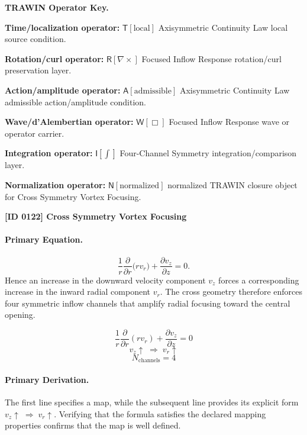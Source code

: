 \par\vspace{0.45\baselineskip}
\noindent\begin{minipage}[t]{\linewidth}
\begingroup
\small
\raggedright
\textbf{TRAWIN Operator Key.}\par
\noindent\textbf{Time/localization operator:} $\mathsf{T}\!\left[\mathrm{local}\right]$ Axisymmetric Continuity Law local source condition.\par
\noindent\textbf{Rotation/curl operator:} $\mathsf{R}\!\left[\nabla\times\right]$ Focused Inflow Response rotation/curl preservation layer.\par
\noindent\textbf{Action/amplitude operator:} $\mathsf{A}\!\left[\mathrm{admissible}\right]$ Axisymmetric Continuity Law admissible action/amplitude condition.\par
\noindent\textbf{Wave/d'Alembertian operator:} $\mathsf{W}\!\left[\Box\right]$ Focused Inflow Response wave or operator carrier.\par
\noindent\textbf{Integration operator:} $\mathsf{I}\!\left[\int\right]$ Four-Channel Symmetry integration/comparison layer.\par
\noindent\textbf{Normalization operator:} $\mathsf{N}\!\left[\mathrm{normalized}\right]$ normalized TRAWIN closure object for Cross Symmetry Vortex Focusing.\par
\endgroup
\end{minipage}

\clearpage
\noindent\textbf{[ID 0122] Cross Symmetry Vortex Focusing}\par
\vspace{0.35em}
\paragraph{Primary Equation.}
\[ \frac{1}{r}\frac{\partial}{\partial r}\bigl(r v_r\bigr) + \frac{\partial v_z}{\partial z} = 0. \] Hence an increase in the downward velocity component $v_z$ forces a corresponding increase in the inward radial component $v_r$. The cross geometry therefore enforces four symmetric inflow channels that amplify radial focusing toward the central opening.

\[
\frac{1}{r}\frac{\partial}{\partial r}(r v_r) + \frac{\partial v_z}{\partial z} = 0
\]
\[
v_z \uparrow \;\Longrightarrow\; v_r \uparrow
\]
\[
N_{\mathrm{channels}} = 4
\]

\paragraph{Primary Derivation.}
The first line specifies a map, while the subsequent line provides its explicit form \( v_z \uparrow \;\Longrightarrow\; v_r \uparrow \). Verifying that the formula satisfies the declared mapping properties confirms that the map is well defined.
